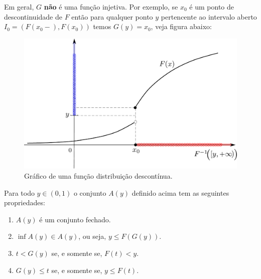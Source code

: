 \begin{observacao}
Em geral, $G$ {\bf não} é uma função injetiva. 
Por exemplo, se 
$x_0$ é um ponto de descontinuidade de $F$ então 
para qualquer ponto $y$ pertencente ao 
intervalo aberto $I_0=(F(x_0-),F(x_0))$ temos  
$G(y)=x_0$, veja figura abaixo:
\begin{center}
\begin{figure}[!htb]
\centering
\includegraphics[width=\textwidth]{Figuras/inversa-gen.pdf}
\caption{Gráfico de uma função distribuição descontínua.}
\label{Rotulo}
\end{figure}
\end{center}
\end{observacao}

\begin{proposicao}\label{prop-propriedades-G}
	Para todo $y\in (0,1)$ o conjunto $A(y)$ definido acima 
	tem as seguintes propriedades:
	\begin{enumerate}
		\item 
		$A(y)$ é um conjunto fechado.
		
		\item
		$\inf A(y) \in A(y)$, ou seja, $y\leq F(G(y))$.
		
		\item 
		$t<G(y)$ se, e somente se, $F(t)<y$.
		
		\item 
		$G(y)\leq t$ se, e somente se, $y\leq F(t)$.
	\end{enumerate}
\end{proposicao}



